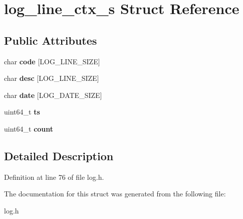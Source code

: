 \hypertarget{structlog__line__ctx__s}{}\section{log\+\_\+line\+\_\+ctx\+\_\+s Struct Reference}
\label{structlog__line__ctx__s}
\subsection*{Public Attributes}
\begin{DoxyCompactItemize}
\item 
char {\bfseries code} \mbox{[}L\+O\+G\+\_\+\+L\+I\+N\+E\+\_\+\+S\+I\+ZE\mbox{]}\hypertarget{structlog__line__ctx__s_ae6e83c561e113b8778be71b9e4847ce8}{}\label{structlog__line__ctx__s_ae6e83c561e113b8778be71b9e4847ce8}

\item 
char {\bfseries desc} \mbox{[}L\+O\+G\+\_\+\+L\+I\+N\+E\+\_\+\+S\+I\+ZE\mbox{]}\hypertarget{structlog__line__ctx__s_a0f9772ed878acb94be30b1898022ee02}{}\label{structlog__line__ctx__s_a0f9772ed878acb94be30b1898022ee02}

\item 
char {\bfseries date} \mbox{[}L\+O\+G\+\_\+\+D\+A\+T\+E\+\_\+\+S\+I\+ZE\mbox{]}\hypertarget{structlog__line__ctx__s_a025e162668d4cc69e50eae50c33180fe}{}\label{structlog__line__ctx__s_a025e162668d4cc69e50eae50c33180fe}

\item 
uint64\+\_\+t {\bfseries ts}\hypertarget{structlog__line__ctx__s_aee815f2103347db9f63455d30938b267}{}\label{structlog__line__ctx__s_aee815f2103347db9f63455d30938b267}

\item 
uint64\+\_\+t {\bfseries count}\hypertarget{structlog__line__ctx__s_a3be5b4b071672854909a477562f9e1ef}{}\label{structlog__line__ctx__s_a3be5b4b071672854909a477562f9e1ef}

\end{DoxyCompactItemize}


\subsection{Detailed Description}


Definition at line 76 of file log.\+h.



The documentation for this struct was generated from the following file\+:\begin{DoxyCompactItemize}
\item 
log.\+h\end{DoxyCompactItemize}
